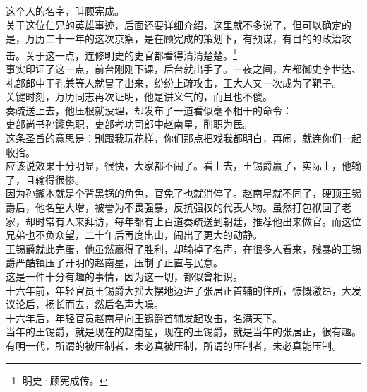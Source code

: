 \begin{multicols}{\theparacolNo}
这个人的名字，叫顾宪成。\\

关于这位仁兄的英雄事迹，后面还要详细介绍，这里就不多说了，但可以确定的是，万历二十一年的这次京察，是在顾宪成的策划下，有预谋，有目的的政治攻击。关于这一点，连修明史的史官都看得清清楚楚。\footnote{明史·顾宪成传。}\\

事实印证了这一点，前台刚刚下课，后台就出手了。一夜之间，左都御史李世达、礼部郎中于孔兼等人就冒了出来，纷纷上疏攻击，王大人又一次成为了靶子。\\

关键时刻，万历同志再次证明，他是讲义气的，而且也不傻。\\

奏疏送上去，他压根就没理，却发布了一道看似毫不相干的命令：\\

吏部尚书孙鑨免职，吏部考功司郎中赵南星，削职为民。\\

这条圣旨的意思是：别跟我玩花样，你们那点把戏我都明白，再闹，就连你们一起收拾。\\

应该说效果十分明显，很快，大家都不闹了。看上去，王锡爵赢了，实际上，他输了，且输得很惨。\\

因为孙鑨本就是个背黑锅的角色，官免了也就消停了。赵南星就不同了，硬顶王锡爵后，他名望大增，被誉为不畏强暴，反抗强权的代表人物。虽然打包袱回了老家，却时常有人来拜访，每年都有上百道奏疏送到朝廷，推荐他出来做官。而这位兄弟也不负众望，二十年后再度出山，闹出了更大的动静。\\

王锡爵就此完蛋，他虽然赢得了胜利，却输掉了名声，在很多人看来，残暴的王锡爵严酷镇压了开明的赵南星，压制了正直与民意。\\

这是一件十分有趣的事情，因为这一切，都似曾相识。\\

十六年前，年轻官员王锡爵大摇大摆地迈进了张居正首辅的住所，慷慨激昂，大发议论后，扬长而去，然后名声大噪。\\

十六年后，年轻官员赵南星向王锡爵首辅发起攻击，名满天下。\\

当年的王锡爵，就是现在的赵南星，现在的王锡爵，就是当年的张居正，很有趣。\\

有明一代，所谓的被压制者，未必真被压制，所谓的压制者，未必真能压制。\\


\end{multicols}
